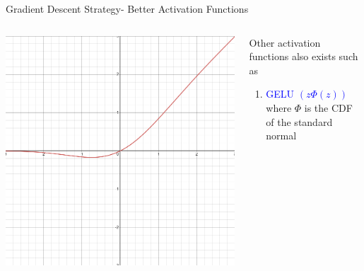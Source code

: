 \begin{frame}{Gradient Descent Strategy- Better Activation Functions}
	\begin{columns}[T]
        \begin{column}{0.5\textwidth}
        	\includegraphics[width=\textwidth]{images/GELU.png}
        \end{column}
	    \begin{column}{0.5\textwidth}
    	    Other activation functions also exists such as 
			\begin{enumerate}[$\bullet$]
				\item \textcolor{blue}{GELU $\left(z\Phi(z)\right)$}where $\Phi$ is the CDF of the standard normal
			\end{enumerate}
    	\end{column}
    \end{columns}
\end{frame}

